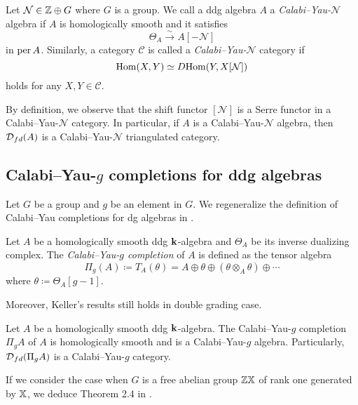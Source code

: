 \begin{definition}
  Let $\mathcal{N} \in \mathbb{Z} \oplus G$ where $G$ is a group.
  We call a ddg algebra $A$ a \textit{Calabi--Yau-$\mathcal{N}$}
  algebra if $A$ is homologically smooth and it satisfies
  \[ \Theta_A \xrightarrow{\sim} A[-\mathcal{N}] \]
  in $\operatorname{per} A$.
  Similarly, a category $\mathcal{C}$ is called
  a \textit{Calabi--Yau-$\mathcal{N}$} category if
  \[ \operatorname{Hom}(X, Y) \simeq \operatorname{\mathnormal{D}Hom}(Y, X[\mathcal{N}]) \]
  holds for any $X, Y \in \mathcal{C}$.
\end{definition}

By definition, we observe that the shift functor $[\mathcal{N}]$
is a Serre functor in a Calabi--Yau-$\mathcal{N}$ category.
In particular, if $A$ is a Calabi--Yau-$\mathcal{N}$ algebra,
then $\operatorname{\mathcal{D}}_{fd}(A)$ is a Calabi--Yau-$\mathcal{N}$ triangulated category.

\subsection{Calabi--Yau-\texorpdfstring{$g$}{g} completions for ddg algebras}
Let $G$ be a group and $g$ be an element in $G$.
We regeneralize the definition of Calabi--Yau completions
for dg algebras in \cite{K2}.

\begin{definition}\label{CYcomp}
  Let $A$ be a homologically smooth ddg $\mathbf{k}$-algebra
  and $\Theta_A$ be its inverse dualizing complex.
  The \textit{Calabi--Yau-$g$ completion} of $A$ is defined as the tensor algebra
  \[
    \Pi_g(A) \coloneq T_A(\theta)
    = A \oplus \theta \oplus (\theta \otimes_A \theta) \oplus \cdots
  \]
  where $\theta \coloneq \Theta_A[g-1]$.
\end{definition}

Moreover, Keller's results \cite{K2} still holds in double grading case.

\begin{theorem}\label{DfdCY}\cite[Theorem 4.8]{K2}
  Let $A$ be a homologically smooth ddg $\mathbf{k}$-algebra.
  The Calabi--Yau-$g$ completion $\Pi_gA$ of $A$ is homologically smooth
  and is a Calabi--Yau-$g$ algebra.
  Particularly, $\operatorname{\mathcal{D}}_{fd}(\Pi_gA)$ is a Calabi--Yau-$g$ category.
\end{theorem}

\begin{remark}
  If we consider the case when $G$ is a free abelian group $\mathbb{Z}\mathbb{X}$
  of rank one generated by $\mathbb{X}$, we deduce Theorem 2.4 in \cite{Q12}.
\end{remark}

